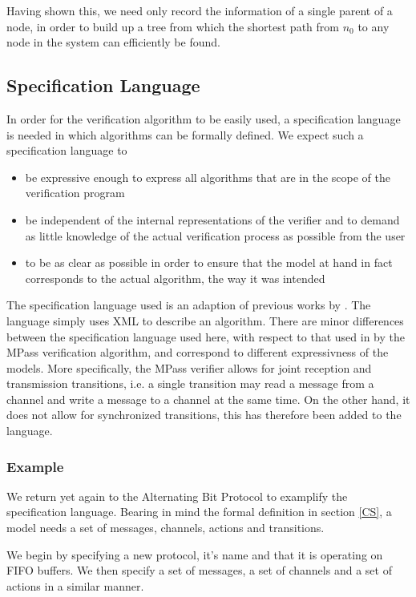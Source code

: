 Having shown this, we need only record the information of a single parent of a node, in order to build up a tree from which the shortest path from $n_0$ to any node in the system can efficiently be found.


\subsection{Specification Language}
In order for the verification algorithm to be easily used, a specification language is needed in which algorithms can be formally defined. We expect such a specification language to

\begin{itemize}
\item
be expressive enough to express all algorithms that are in the scope of the verification program
\item
be independent of the internal representations of the verifier and to demand as little knowledge of the actual verification process as possible from the user
\item
to be as clear as possible in order to ensure that the model at hand in fact corresponds to the actual algorithm, the way it was intended
\end{itemize}

The specification language used is an adaption of previous works by . The language simply uses XML to describe an algorithm. There are minor differences between the specification language used here, with respect to that used in by the MPass verification algorithm, and correspond to different expressivness of the models. More specifically, the MPass verifier allows for joint reception and transmission transitions, i.e. a single transition may read a message from a channel and write a message to a channel at the same time. On the other hand, it does not allow for synchronized transitions, this has therefore been added to the language.

\subsubsection{Example}
We return yet again to the Alternating Bit Protocol to examplify the specification language. Bearing in mind the formal definition in section \ref{CS}, a model needs a set of messages, channels, actions and transitions.

We begin by specifying a new protocol, it's name and that it is operating on FIFO buffers. We then specify a set of messages, a set of channels and a set of actions in a similar manner.

